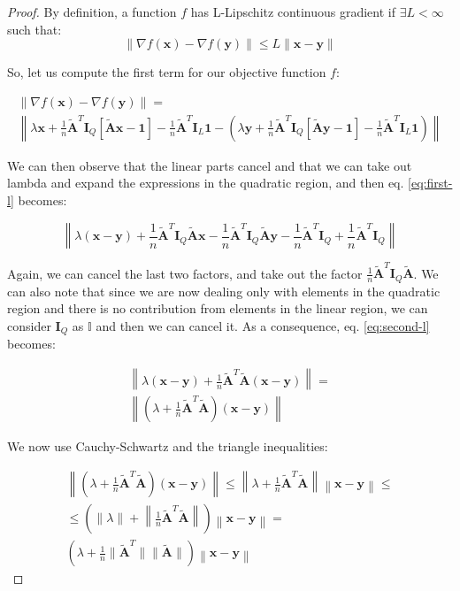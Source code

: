 \documentclass[12pt]{article}
\newcommand{\xb}{\mathbf{x}}
\newcommand{\yb}{\mathbf{y}}
\newcommand{\atilde}{\mathbf{\tilde{A}}}
\newcommand{\id}{\mathbf{I}}
\newcommand{\ones}{\mathbf{1}}
\begin{document}
\begin{proof}
By definition, a function $f$ has L-Lipschitz continuous gradient if $\exists L < \infty$ such that:
\begin{equation} \label{eq:l-smooth}
    \lVert \nabla f(\xb) - \nabla f(\yb) \rVert \leq L \lVert \xb - \yb \rVert
\end{equation}

So, let us compute the first term for our objective function $f$:

\begin{gather}
    \lVert \nabla f(\xb) - \nabla f(\yb) \rVert = \nonumber \\
    \left \lVert \lambda\xb + \frac{1}{n}\atilde^T\id_Q[\atilde \xb - \ones] - \frac{1}{n}\atilde^T\id_L\ones - \left ( \lambda\yb + \frac{1}{n}\atilde^T\id_Q[\atilde \yb - \ones] - \frac{1}{n}\atilde^T\id_L\ones \right ) \right \rVert \label{eq:first-l}
\end{gather}

We can then observe that the linear parts cancel and that we can take out lambda and expand the expressions in the quadratic region, and then eq. \ref{eq:first-l} becomes:

\begin{equation} \label{eq:second-l}
        \left \lVert \lambda (\xb - \yb) + \frac{1}{n}\atilde^T\id_Q\atilde\xb - \frac{1}{n}\atilde^T\id_Q\atilde\yb - \frac{1}{n}\atilde^T\id_Q + \frac{1}{n}\atilde^T\id_Q \right\rVert 
\end{equation}

Again, we can cancel the last two factors, and take out the factor $\frac{1}{n}\atilde^T\id_Q\atilde$. We can also note that since we are now dealing only with elements in the quadratic region and there is no contribution from elements in the linear region, we can consider $\id_Q$ as $\mathbb{I}$ and then we can cancel it. As a consequence, eq. \ref{eq:second-l} becomes:

\begin{gather}
    \left \lVert \lambda(\xb - \yb) + \frac{1}{n}\atilde^T\atilde (\xb - \yb) \right \rVert = \nonumber \\
    \left \lVert \left ( \lambda + \frac{1}{n}\atilde^T\atilde \right ) (\xb - \yb) \right \rVert \label{eq:third-l}
\end{gather}

We now use Cauchy-Schwartz and the triangle inequalities:

\begin{gather}
    \left \lVert \left ( \lambda + \frac{1}{n}\atilde^T\atilde \right ) (\xb - \yb) \right \rVert \leq
    \left \lVert \lambda + \frac{1}{n}\atilde^T\atilde \right \rVert \left \lVert \xb - \yb \right \rVert \leq \nonumber \\
    \leq \left ( \lVert \lambda \rVert + \left \lVert \frac{1}{n}\atilde^T\atilde \right \rVert \right ) \left \lVert \xb - \yb \right \rVert = \nonumber \\
    \left (\lambda + \frac{1}{n} \lVert \atilde^T \rVert \lVert \atilde \rVert  \right ) \left \lVert \xb - \yb \right \rVert \label{eq:fourth-l}
\end{gather}


\end{proof}
\end{document}
